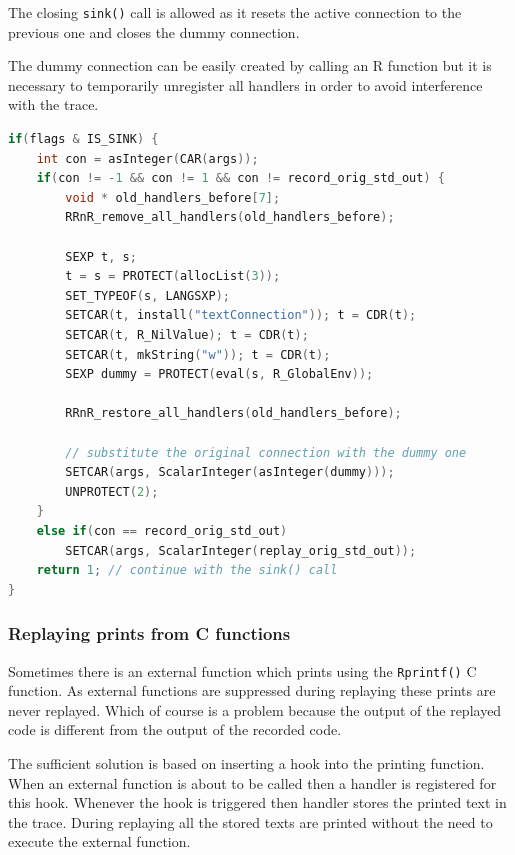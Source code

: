 \documentclass[thesis=M,english,hidelinks]{FITthesis}[2012/10/20]
\begin{document}
			The closing \lstinline|sink()| call is allowed as it resets the active connection to the previous one and closes the dummy connection.\par
			
			The dummy connection can be easily created by calling an R function but it is necessary to temporarily unregister all handlers in order to avoid interference with the trace.\par
		
\begin{lstlisting}[style=filestyle, language=C, caption={Dummy connection creation and substitution in the \lstinline|sink()| call}]
if(flags & IS_SINK) {
	int con = asInteger(CAR(args));
	if(con != -1 && con != 1 && con != record_orig_std_out) {
		void * old_handlers_before[7];
		RRnR_remove_all_handlers(old_handlers_before);

		SEXP t, s;
		t = s = PROTECT(allocList(3));
		SET_TYPEOF(s, LANGSXP);
		SETCAR(t, install("textConnection")); t = CDR(t);
		SETCAR(t, R_NilValue); t = CDR(t);
		SETCAR(t, mkString("w")); t = CDR(t);
		SEXP dummy = PROTECT(eval(s, R_GlobalEnv));

		RRnR_restore_all_handlers(old_handlers_before);

		// substitute the original connection with the dummy one
		SETCAR(args, ScalarInteger(asInteger(dummy)));
		UNPROTECT(2);
	}
	else if(con == record_orig_std_out)
		SETCAR(args, ScalarInteger(replay_orig_std_out));
	return 1; // continue with the sink() call
}
\end{lstlisting}
		
			\subsubsection{Replaying prints from C functions}
			Sometimes there is an external function which prints using the \lstinline|Rprintf()| C function. As external functions are suppressed during replaying these prints are never replayed. Which of course is a problem because the output of the replayed code is different from the output of the recorded code.\par
			
			The sufficient solution is based on inserting a hook into the printing function. When an external function is about to be called then a handler is registered for this hook. Whenever the hook is triggered then handler stores the printed text in the trace. During replaying all the stored texts are printed without the need to execute the external function.\par
			
\end{document}
